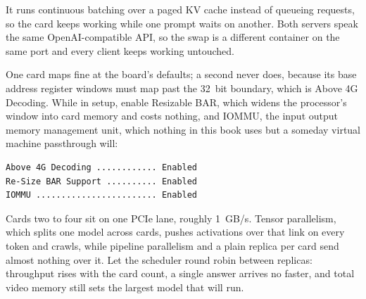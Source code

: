  It runs continuous batching over a
paged KV cache instead of queueing requests, so the card keeps working while
one prompt waits on another\cite{vllmDistributed}. Both servers speak the same
OpenAI-compatible API, so the swap is a different container on the same port and
every client keeps working untouched.


 One card maps fine at the
board's defaults; a second never does, because its base address
register windows must map past the 32~bit boundary, which is
Above 4G Decoding\cite{gigabyteB650EagleAX}. While in setup, enable
Resizable BAR, which widens the processor's window into card memory and
costs nothing, and IOMMU, the input output memory management unit, which
nothing in this book uses but a someday virtual machine
passthrough will:

\begin{verbatim}
Above 4G Decoding ............ Enabled
Re-Size BAR Support .......... Enabled
IOMMU ........................ Enabled
\end{verbatim}

 Cards two to four sit on one PCIe lane,
roughly 1~GB/s. Tensor parallelism, which splits one model across cards,
pushes activations over that link on every token and crawls, while pipeline
parallelism and a plain replica per card send almost nothing over it. Let the
scheduler round robin between replicas: throughput rises with the card count, a
single answer arrives no faster, and total video memory still sets the largest
model that will run.


\clearpage
